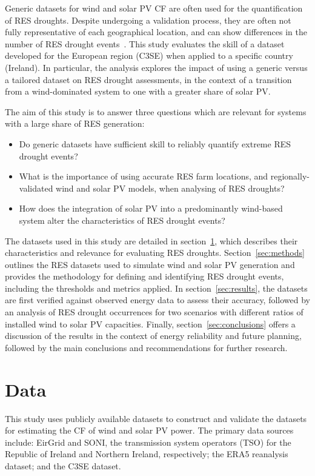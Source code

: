\documentclass[preprint, 12pt]{elsarticle}
\begin{document}
Generic datasets for wind and solar PV CF are often used for the quantification of RES droughts. Despite undergoing a validation process, they are often not fully representative of each geographical location, and can show differences in the number of RES drought events~\citep{kies2021drought}. This study evaluates the skill of a dataset developed for the European region (C3SE) when applied to a specific country (Ireland). In particular, the analysis explores the impact of using a generic versus a tailored dataset on RES drought assessments, in the context of a transition from a wind-dominated system to one with a greater share of solar PV.

The aim of this study is to answer three questions which are relevant for systems with a large share of RES generation:
\begin{itemize}
	\item Do generic datasets have sufficient skill to reliably quantify extreme RES drought events?
	\item What is the importance of using accurate RES farm locations, and regionally-validated wind and solar PV models, when analysing of RES droughts?
	\item How does the integration of solar PV into a predominantly wind-based system alter the characteristics of RES drought events?
\end{itemize}

The datasets used in this study are detailed in section~\ref{sec:data}, which describes their characteristics and relevance for evaluating RES droughts. Section~\ref{sec:methods} outlines the RES datasets used to simulate wind and solar PV generation and provides the methodology for defining and identifying RES drought events, including the thresholds and metrics applied. In section~\ref{sec:results}, the datasets are first verified against observed energy data to assess their accuracy, followed by an analysis of RES drought occurrences for two scenarios with different ratios of installed wind to solar PV capacities. Finally, section~\ref{sec:conclusions} offers a discussion of the results in the context of energy reliability and future planning, followed by the main conclusions and recommendations for further research.

\section{Data}
\label{sec:data}

This study uses publicly available datasets to construct and validate the datasets for estimating the CF of wind and solar PV power. The primary data sources include: EirGrid and SONI, the transmission system operators (TSO) for the Republic of Ireland and Northern Ireland, respectively; the ERA5 reanalysis dataset; and the C3SE dataset.
\end{document}
